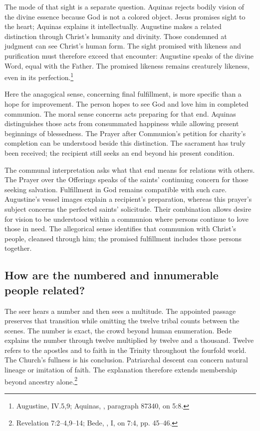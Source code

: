 The mode of that sight is a separate question. Aquinas rejects bodily vision of the divine essence because God is not a colored object. Jesus promises sight to the heart; Aquinas explains it intellectually. Augustine makes a related distinction through Christ's humanity and divinity. Those condemned at judgment can see Christ's human form. The sight promised with likeness and purification must therefore exceed that encounter: Augustine speaks of the divine Word, equal with the Father. The promised likeness remains creaturely likeness, even in its perfection.\footnote{Augustine,  IV.5,9; Aquinas, , paragraph 87340, on 5:8.}

Here the anagogical sense, concerning final fulfillment, is more specific than a hope for improvement. The person hopes to see God and love him in completed communion. The moral sense concerns acts preparing for that end. Aquinas distinguishes those acts from consummated happiness while allowing present beginnings of blessedness. The Prayer after Communion's petition for charity's completion can be understood beside this distinction. The sacrament has truly been received; the recipient still seeks an end beyond his present condition.

The communal interpretation asks what that end means for relations with others. The Prayer over the Offerings speaks of the saints' continuing concern for those seeking salvation. Fulfillment in God remains compatible with such care. Augustine's vessel images explain a recipient's preparation, whereas this prayer's subject concerns the perfected saints' solicitude. Their combination allows desire for vision to be understood within a communion where persons continue to love those in need. The allegorical sense identifies that communion with Christ's people, cleansed through him; the promised fulfillment includes those persons together.

\subsection{How are the numbered and innumerable people related?}
The seer hears a number and then sees a multitude. The appointed passage preserves that transition while omitting the twelve tribal counts between the scenes. The number is exact, the crowd beyond human enumeration. Bede explains the number through twelve multiplied by twelve and a thousand. Twelve refers to the apostles and to faith in the Trinity throughout the fourfold world. The Church's fullness is his conclusion. Patriarchal descent can concern natural lineage or imitation of faith. The explanation therefore extends membership beyond ancestry alone.\footnote{Revelation 7:2--4,9--14; Bede, , I, on 7:4, pp. 45--46.}

